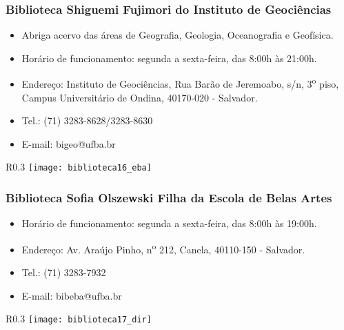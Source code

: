     \subsubsection{Biblioteca Shiguemi Fujimori do Instituto de Geociências}
        \begin{itemize}
            \item Abriga acervo das áreas de Geografia, Geologia, Oceanografia e Geofísica.
            \item Horário de funcionamento: segunda a sexta-feira, das 8:00h às 21:00h.
            \item Endereço: Instituto de Geociências, Rua Barão de Jeremoabo, s/n, 3\textsuperscript{o} piso, Campus Universitário de Ondina, 40170-020 - Salvador.
            \item Tel.: (71) 3283-8628/3283-8630
            \item E-mail: bigeo@ufba.br
        \end{itemize}
        
        \begin{wrapfigure}{R}{0.3\textwidth}
            \centering
            \texttt{[image: biblioteca16\_eba]}
        \end{wrapfigure}
    \subsubsection{Biblioteca Sofia Olszewski Filha da Escola de Belas Artes}
        \begin{itemize}
            \item Horário de funcionamento: segunda a sexta-feira, das 8:00h às 19:00h.
            \item Endereço: Av. Araújo Pinho, n\textsuperscript{o} 212, Canela, 40110-150 - Salvador.
            \item Tel.: (71) 3283-7932
            \item E-mail: bibeba@ufba.br
        \end{itemize}
        \begin{wrapfigure}{R}{0.3\textwidth}
            \centering
            \texttt{[image: biblioteca17\_dir]}
        \end{wrapfigure}
